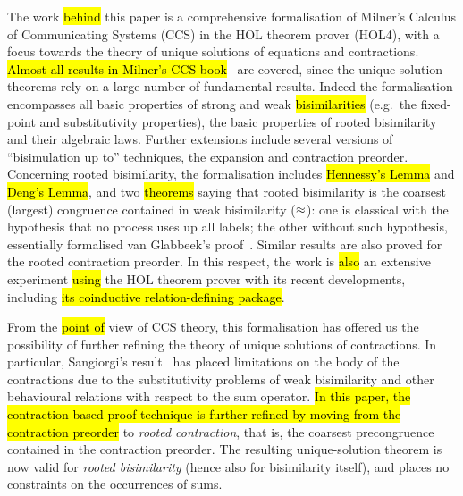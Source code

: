 The work \hl{behind} this paper is a
comprehensive formalisation of Milner's Calculus of Communicating
Systems (CCS) in the HOL theorem prover (HOL4),
with a focus towards the theory of unique solutions of equations and contractions.
\hl{Almost all results in Milner's CCS book}~\cite{Mil89} are covered, since
the unique-solution theorems rely on a large number of fundamental results.
Indeed the formalisation encompasses all basic properties of strong and weak
\hl{bisimilarities} (e.g.~the fixed-point and substitutivity properties), the
basic properties of rooted bisimilarity and their algebraic laws.
Further extensions include several versions of ``bisimulation up to''
techniques, the expansion and contraction preorder.
Concerning rooted bisimilarity, the formalisation
includes \hl{Hennessy's Lemma} and \hl{Deng's Lemma},
 and two \hl{theorems} saying that rooted bisimilarity is the coarsest (largest)
 congruence contained in weak bisimilarity ($\approx$): one is classical
 with the hypothesis that no process uses up all labels;
the other without such hypothesis, essentially formalised van Glabbeek's proof~\cite{van2005characterisation}.
Similar results are also proved for the rooted contraction preorder.
In this respect, the work is \hl{also} an extensive experiment \hl{using} the HOL theorem prover with its
recent developments, including \hl{its coinductive relation-defining package}.

From the \hl{point of} view of CCS theory, this formalisation has offered us the possibility of
further refining the theory of unique solutions of contractions.
In particular, Sangiorgi's result~\cite{sangiorgi2017equations} has
placed limitations on the body of the contractions due to the
substitutivity problems of weak bisimilarity and other behavioural relations with respect
to the sum operator.
\hl{In this paper, the contraction-based proof technique is further
refined by moving from the contraction preorder} to
\emph{rooted contraction}, that is, the coarsest precongruence contained in the contraction
preorder. The resulting unique-solution theorem is now valid for
\emph{rooted bisimilarity} (hence also for bisimilarity itself), and places no 
constraints on the occurrences of sums.


